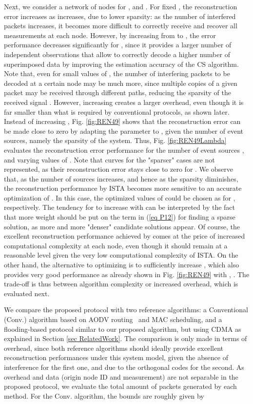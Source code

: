 \documentclass[letterpaper,conference]{IEEEtran}
\begin{document}
Next, we consider a network of  nodes for ,  and .
For fixed , the reconstruction error increases as  increases, due to lower sparsity: as the number of interfered packets increases, it becomes more difficult to correctly receive and recover all measurements at each node. However, by increasing  from  to , the error performance decreases significantly for , since it provides a larger number of independent observations that allow to correctly decode a higher number of superimposed data by improving the estimation accuracy of the CS algorithm. Note that, even for small values of , the number of interfering packets to be decoded at a certain node may be much more, since multiple copies of a given packet may be received through different paths, reducing the sparsity of the received signal .
However, increasing  creates a larger overhead, even though it is far smaller than what is required by conventional protocols, as shown later.
Instead of increasing , Fig. \ref{fig:REN49} shows that the reconstruction error can be made close to zero by adapting the parameter  to , given the number of event sources, namely the sparsity of the system. Thus,
Fig. \ref{fig:REN49Lambda} evaluates the reconstruction error performance for the number of event sources , and varying values of . Note that curves for the "sparser" cases  are not represented, as their reconstruction error stays close to zero for . We observe that, as the number of sources increases, and hence as the sparsity diminishes, the reconstruction performance by ISTA becomes more sensitive to an accurate optimization of . In this case, the optimized values of  could be chosen as  for , respectively. The tendency for  to increase with  can be interpreted by the fact that more weight should be put on the  term in (\ref{eq P12}) for finding a sparse solution, as more and more "denser" candidate solutions appear.
Of course, the excellent reconstruction performance achieved by  comes at the price of increased computational complexity at each node, even though it should remain at a reasonable level given the very low computational complexity of ISTA. On the other hand, the alternative to optimizing  is to sufficiently increase , which also provides very good performance as already shown in Fig. \ref{fig:REN49} with , . The trade-off is thus between algorithm complexity or increased overhead, which is evaluated next.

We compare the proposed protocol with two reference algorithms: a Conventional (Conv.) algorithm based on AODV routing~\cite{aodv} and MAC scheduling, and a flooding-based protocol similar to our proposed algorithm, but using CDMA as explained in Section \ref{sec RelatedWork}. The comparison is only made in terms of overhead, since both reference algorithms should ideally provide excellent reconstruction performances under this system model, given the absence of interference for the first one, and due to the orthogonal codes for the second.
As overhead and data (origin node ID and measurement) are not separable in the proposed protocol, we evaluate the total amount of packets generated by each method. For the Conv. algorithm, the bounds are roughly given by
\end{document}
